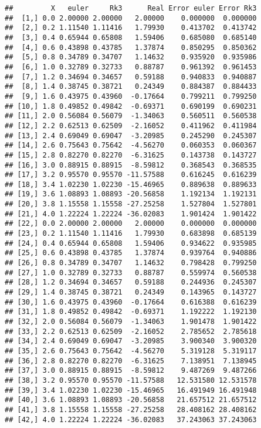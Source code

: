 \documentclass[]{article}
\begin{document}
\begin{verbatim}
##         X   euler     Rk3      Real Error euler Error Rk3
##  [1,] 0.0 2.00000 2.00000   2.00000    0.000000  0.000000
##  [2,] 0.2 1.11540 1.11416   1.79930    0.413702  0.413742
##  [3,] 0.4 0.65944 0.65808   1.59406    0.685080  0.685140
##  [4,] 0.6 0.43898 0.43785   1.37874    0.850295  0.850362
##  [5,] 0.8 0.34789 0.34707   1.14632    0.935920  0.935986
##  [6,] 1.0 0.32789 0.32733   0.88787    0.961392  0.961453
##  [7,] 1.2 0.34694 0.34657   0.59188    0.940833  0.940887
##  [8,] 1.4 0.38745 0.38721   0.24349    0.884387  0.884433
##  [9,] 1.6 0.43975 0.43960  -0.17664    0.799211  0.799250
## [10,] 1.8 0.49852 0.49842  -0.69371    0.690199  0.690231
## [11,] 2.0 0.56084 0.56079  -1.34063    0.560511  0.560538
## [12,] 2.2 0.62513 0.62509  -2.16052    0.411962  0.411984
## [13,] 2.4 0.69049 0.69047  -3.20985    0.245290  0.245307
## [14,] 2.6 0.75643 0.75642  -4.56270    0.060353  0.060367
## [15,] 2.8 0.82270 0.82270  -6.31625    0.143738  0.143727
## [16,] 3.0 0.88915 0.88915  -8.59812    0.368543  0.368535
## [17,] 3.2 0.95570 0.95570 -11.57588    0.616245  0.616239
## [18,] 3.4 1.02230 1.02230 -15.46965    0.889638  0.889633
## [19,] 3.6 1.08893 1.08893 -20.56858    1.192134  1.192131
## [20,] 3.8 1.15558 1.15558 -27.25258    1.527804  1.527801
## [21,] 4.0 1.22224 1.22224 -36.02083    1.901424  1.901422
## [22,] 0.0 2.00000 2.00000   2.00000    0.000000  0.000000
## [23,] 0.2 1.11540 1.11416   1.79930    0.683898  0.685139
## [24,] 0.4 0.65944 0.65808   1.59406    0.934622  0.935985
## [25,] 0.6 0.43898 0.43785   1.37874    0.939764  0.940886
## [26,] 0.8 0.34789 0.34707   1.14632    0.798428  0.799250
## [27,] 1.0 0.32789 0.32733   0.88787    0.559974  0.560538
## [28,] 1.2 0.34694 0.34657   0.59188    0.244936  0.245307
## [29,] 1.4 0.38745 0.38721   0.24349    0.143965  0.143727
## [30,] 1.6 0.43975 0.43960  -0.17664    0.616388  0.616239
## [31,] 1.8 0.49852 0.49842  -0.69371    1.192222  1.192130
## [32,] 2.0 0.56084 0.56079  -1.34063    1.901478  1.901422
## [33,] 2.2 0.62513 0.62509  -2.16052    2.785652  2.785618
## [34,] 2.4 0.69049 0.69047  -3.20985    3.900340  3.900320
## [35,] 2.6 0.75643 0.75642  -4.56270    5.319128  5.319117
## [36,] 2.8 0.82270 0.82270  -6.31625    7.138951  7.138945
## [37,] 3.0 0.88915 0.88915  -8.59812    9.487269  9.487266
## [38,] 3.2 0.95570 0.95570 -11.57588   12.531580 12.531578
## [39,] 3.4 1.02230 1.02230 -15.46965   16.491949 16.491948
## [40,] 3.6 1.08893 1.08893 -20.56858   21.657512 21.657512
## [41,] 3.8 1.15558 1.15558 -27.25258   28.408162 28.408162
## [42,] 4.0 1.22224 1.22224 -36.02083   37.243063 37.243063
\end{verbatim}
\end{document}
